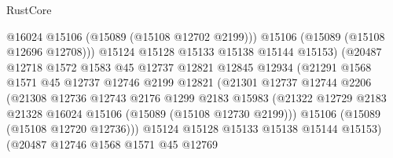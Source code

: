 \begin{lexlean}{RustCore}
\begin{coremodule}
                                    @16024
                                    @15106
                                    (@15089 (@15108 @12702 @2199)))
                                  @15106
                                  (@15089 (@15108 @12696 @12708)))
                                @15124
                                @15128
                                @15133
                                @15138
                                @15144
                                @15153)
                              (@20487
                                @12718
                                @1572
                                @1583
                                @45
                                @12737
                                @12821
                                @12845
                                @12934
                                (@21291
                                  @1568
                                  @1571
                                  @45
                                  @12737
                                  @12746
                                  @2199
                                  @12821
                                  (@21301
                                    @12737
                                    @12744
                                    @2206
                                    (@21308
                                      @12736
                                      @12743
                                      @2176
                                      @1299
                                      @2183
                                      @15983
                                      (@21322
                                        @12729
                                        @2183
                                        @21328
                                        @16024
                                        @15106
                                        (@15089 (@15108 @12730 @2199)))
                                      @15106
                                      (@15089 (@15108 @12720 @12736)))
                                    @15124
                                    @15128
                                    @15133
                                    @15138
                                    @15144
                                    @15153)
                                  (@20487
                                    @12746
                                    @1568
                                    @1571
                                    @45
                                    @12769

\end{coremodule}
\end{lexlean}
